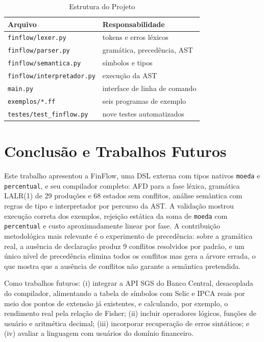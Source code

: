 \documentclass[conference]{IEEEtran}
\begin{document}
\begin{table}[!htbp]
\caption{Estrutura do Projeto}
\label{tab:estrutura}
\centering
\footnotesize
\begin{tabular}{@{}p{}p{}@{}}
\toprule
\textbf{Arquivo} & \textbf{Responsabilidade} \\
\midrule
\texttt{finflow/lexer.py} & tokens e erros léxicos \\
\texttt{finflow/parser.py} & gramática, precedência, AST \\
\texttt{finflow/semantica.py} & símbolos e tipos \\
\texttt{finflow/interpretador.py} & execução da AST \\
\texttt{main.py} & interface de linha de comando \\
\texttt{exemplos/*.ff} & seis programas de exemplo \\
\texttt{testes/test\_finflow.py} & nove testes automatizados \\
\bottomrule
\end{tabular}
\end{table}

\section{Conclusão e Trabalhos Futuros}
\label{sec:conclusao}

Este trabalho apresentou a FinFlow, uma DSL externa com tipos nativos \texttt{moeda} e \texttt{percentual}, e seu compilador completo: AFD para a fase léxica, gramática LALR(1) de 29 produções e 68 estados sem conflitos, análise semântica com regras de tipo e interpretador por percurso da AST. A validação mostrou execução correta dos exemplos, rejeição estática da soma de \texttt{moeda} com \texttt{percentual} e custo aproximadamente linear por fase. A contribuição metodológica mais relevante é o experimento de precedência: sobre a gramática real, a ausência de declaração produz 9 conflitos resolvidos por padrão, e um único nível de precedência elimina todos os conflitos mas gera a árvore errada, o que mostra que a ausência de conflitos não garante a semântica pretendida.

Como trabalhos futuros: (i) integrar a API SGS do Banco Central, desacoplada do compilador, alimentando a tabela de símbolos com Selic e IPCA reais por meio dos pontos de extensão já existentes, e calculando, por exemplo, o rendimento real pela relação de Fisher; (ii) incluir operadores lógicos, funções de usuário e aritmética decimal; (iii) incorporar recuperação de erros sintáticos; e (iv) avaliar a linguagem com usuários do domínio financeiro.
\end{document}
